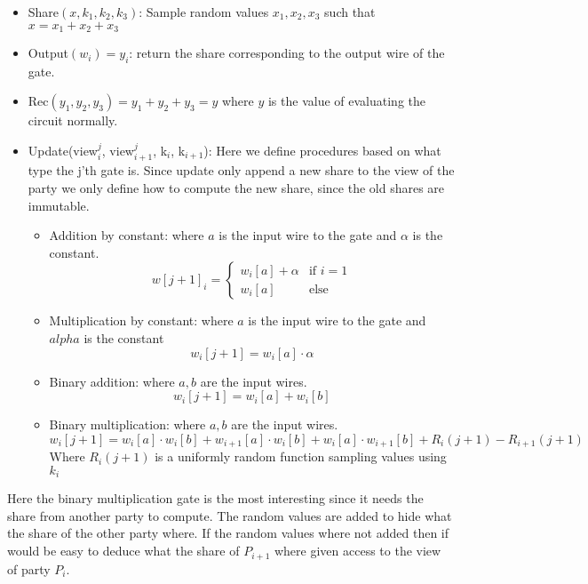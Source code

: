 \begin{itemize}
  \item Share$(x, k_{1}, k_{2}, k_{3})$: Sample random values
    $x_{1}, x_{2}, x_{3}$ such that $x = x_{1} + x_{2} + x_{3}$
  \item Output$(w_{i}) = y_{i}$: return the share corresponding to the output wire of
    the gate.
  \item Rec$(y_{1}, y_{2}, y_{3}) = y_{1} + y_{2} + y_{3} = y$ where $y$ is the
    value of evaluating the circuit normally.
  \item Update(view$^{j}_{i}$, view$^{j}_{i+1}$, k$_{i}$, k$_{i+1}$): Here we
    define procedures based on what type the j'th gate is. Since update only
    append a new share to the view of the party we only define how to compute
    the new share, since the old shares are immutable.
    \begin{itemize}
      \item Addition by constant: where $a$ is the input wire to the gate
        and $\alpha$ is the constant.
        $$ w[j+1]_{i} =
        \begin{cases} w_{i}[a] + \alpha & \text{if } i = 1 \\
                      w_{i}[a]          & \text{else}       %
        \end{cases}$$
      \item Multiplication by constant: where $a$ is the input wire to the gate
        and $alpha$ is the constant
        $$ w_{i}[j+1] = w_{i}[a] \cdot \alpha$$
      \item Binary addition: where $a, b$ are the input wires.
        $$
        w_{i}[j+1] = w_{i}[a] + w_{i}[b]
        $$
      \item Binary multiplication: where $a, b$ are the input wires.
        $$
        w_{i}[j+1] = w_{i}[a] \cdot w_{i}[b] + w_{i+1}[a] \cdot w_{i}[b] + w_{i}[a] \cdot w_{i+1}[b] + R_{i}(j+1) - R_{i+1}(j+1)
        $$
        Where $R_{i}(j+1)$ is a uniformly random function sampling values using $k_{i}$
    \end{itemize}
\end{itemize}

Here the binary multiplication gate is the most interesting since it needs the
share from another party to compute. The random values are added to hide what
the share of the other party where. If the random values where not added then if
would be easy to deduce what the share of $P_{i+1}$ where given access to the
view of party $P_{i}$.

